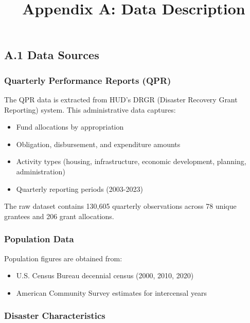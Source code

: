 \documentclass[
  12pt,
  letterpaper,
]{article}
\title{Appendix A: Data Description}
\author{}
\date{}
\providecommand{\tightlist}{%
  \setlength{\itemsep}{0pt}\setlength{\parskip}{0pt}}
\begin{document}
\maketitle


\subsection{A.1 Data Sources}\label{a.1-data-sources}

\subsubsection{Quarterly Performance Reports
(QPR)}\label{quarterly-performance-reports-qpr}

The QPR data is extracted from HUD's DRGR (Disaster Recovery Grant
Reporting) system. This administrative data captures:

\begin{itemize}
\tightlist
\item
  Fund allocations by appropriation
\item
  Obligation, disbursement, and expenditure amounts
\item
  Activity types (housing, infrastructure, economic development,
  planning, administration)
\item
  Quarterly reporting periods (2003-2023)
\end{itemize}

The raw dataset contains 130,605 quarterly observations across 78 unique
grantees and 206 grant allocations.

\subsubsection{Population Data}\label{population-data}

Population figures are obtained from:

\begin{itemize}
\tightlist
\item
  U.S. Census Bureau decennial census (2000, 2010, 2020)
\item
  American Community Survey estimates for intercensal years
\end{itemize}

\subsubsection{Disaster Characteristics}\label{disaster-characteristics}
\end{document}
